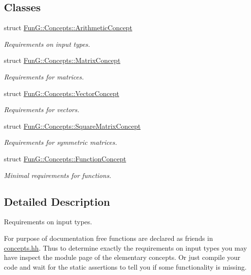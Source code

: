 \subsection*{Classes}
\begin{DoxyCompactItemize}
\item 
struct \hyperlink{structFunG_1_1Concepts_1_1ArithmeticConcept}{Fun\+G\+::\+Concepts\+::\+Arithmetic\+Concept}
\begin{DoxyCompactList}\small\item\em Requirements on input types. \end{DoxyCompactList}\item 
struct \hyperlink{structFunG_1_1Concepts_1_1MatrixConcept}{Fun\+G\+::\+Concepts\+::\+Matrix\+Concept}
\begin{DoxyCompactList}\small\item\em Requirements for matrices. \end{DoxyCompactList}\item 
struct \hyperlink{structFunG_1_1Concepts_1_1VectorConcept}{Fun\+G\+::\+Concepts\+::\+Vector\+Concept}
\begin{DoxyCompactList}\small\item\em Requirements for vectors. \end{DoxyCompactList}\item 
struct \hyperlink{structFunG_1_1Concepts_1_1SquareMatrixConcept}{Fun\+G\+::\+Concepts\+::\+Square\+Matrix\+Concept}
\begin{DoxyCompactList}\small\item\em Requirements for symmetric matrices. \end{DoxyCompactList}\item 
struct \hyperlink{structFunG_1_1Concepts_1_1FunctionConcept}{Fun\+G\+::\+Concepts\+::\+Function\+Concept}
\begin{DoxyCompactList}\small\item\em Minimal requirements for functions. \end{DoxyCompactList}\end{DoxyCompactItemize}


\subsection{Detailed Description}
Requirements on input types. 

For purpose of documentation free functions are declared as friends in \hyperlink{concepts_8hh}{concepts.\+hh}. Thus to determine exactly the requirements on input types you may have inspect the module page of the elementary concepts. Or just compile your code and wait for the static assertions to tell you if some functionality is missing. 